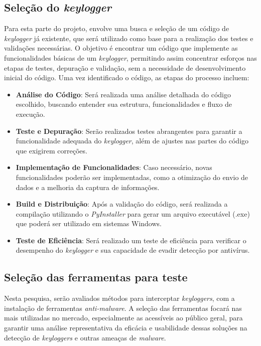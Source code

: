 \documentclass[12pt]{article}
\begin{document}
\subsection{Seleção do \textit{keylogger}}
Para esta parte do projeto, envolve uma busca e seleção de um código de \textit{keylogger} já existente, que será utilizado como base para a realização dos testes e validações necessárias. O objetivo é encontrar um código que implemente as funcionalidades básicas de um \textit{keylogger}, permitindo assim concentrar esforços nas etapas de testes, depuração e validação, sem a necessidade de desenvolvimento inicial do código. Uma vez identificado o código, as etapas do processo incluem:

\begin{itemize}
    \item \textbf{Análise do Código}: Será realizada uma análise detalhada do código escolhido, buscando entender sua estrutura, funcionalidades e fluxo de execução.
    \item \textbf{Teste e Depuração}: Serão realizados testes abrangentes para garantir a funcionalidade adequada do \textit{keylogger}, além de ajustes nas partes do código que exigirem correções.
    \item \textbf{Implementação de Funcionalidades}: Caso necessário, novas funcionalidades poderão ser implementadas, como a otimização do envio de dados e a melhoria da captura de informações.
    \item \textbf{Build e Distribuição}: Após a validação do código, será realizada a compilação utilizando o \textit{PyInstaller} para gerar um arquivo executável (.exe) que poderá ser utilizado em sistemas Windows.
    \item \textbf{Teste de Eficiência}: Será realizado um teste de eficiência para verificar o desempenho do \textit{keylogger} e sua capacidade de evadir detecção por antivírus.
\end{itemize}

\subsection{Seleção das ferramentas para teste}
Nesta pesquisa, serão avaliados métodos para interceptar \textit{keyloggers}, com a instalação de ferramentas \textit{anti-malware}. A seleção das ferramentas focará nas mais utilizadas no mercado, especialmente as acessíveis ao público geral, para garantir uma análise representativa da eficácia e usabilidade dessas soluções na detecção de \textit{keyloggers} e outras ameaças de \textit{malware}.
\end{document}
